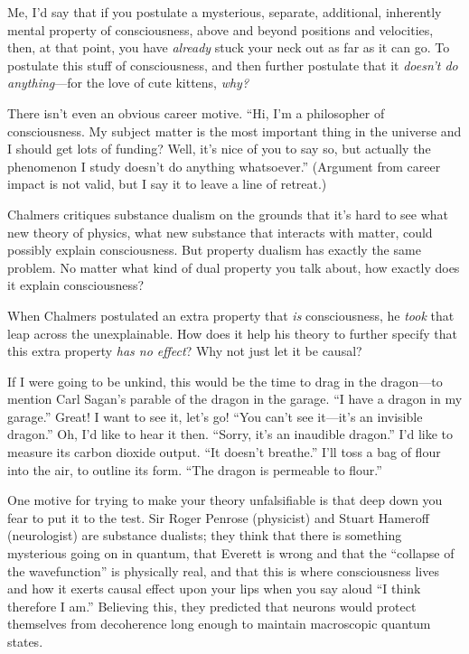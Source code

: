 {
 Me, I'd say that if you postulate a mysterious,
separate, additional, inherently mental property of consciousness,
above and beyond positions and velocities, then, at that point, you
have \textit{already} stuck your neck out as far as it can go. To
postulate this stuff of consciousness, and then further postulate that
it \textit{doesn't do anything}{}---for the love of
cute kittens, \textit{why?}}

{
 There isn't even an obvious career motive.
``Hi, I'm a philosopher of
consciousness. My subject matter is the most important thing in the
universe and I should get lots of funding? Well, it's
nice of you to say so, but actually the phenomenon I study
doesn't do anything whatsoever.''
(Argument from career impact is not valid, but I say it to leave a line
of retreat.)}

{
 Chalmers critiques substance dualism on the grounds that
it's hard to see what new theory of physics, what new
substance that interacts with matter, could possibly explain
consciousness. But property dualism has exactly the same problem. No
matter what kind of dual property you talk about, how exactly does it
explain consciousness?}

{
 When Chalmers postulated an extra property that \textit{is}
consciousness, he \textit{took} that leap across the unexplainable. How
does it help his theory to further specify that this extra property
\textit{has no effect}? Why not just let it be causal?}

{
 If I were going to be unkind, this would be the time to drag in
the dragon---to mention Carl Sagan's parable of the
dragon in the garage. ``I have a dragon in my
garage.'' Great! I want to see it,
let's go! ``You can't
see it---it's an invisible dragon.''
Oh, I'd like to hear it then. ``Sorry,
it's an inaudible dragon.''
I'd like to measure its carbon dioxide output.
``It doesn't
breathe.'' I'll toss a bag of flour
into the air, to outline its form. ``The dragon is
permeable to flour.''}

{
 One motive for trying to make your theory unfalsifiable is that
deep down you fear to put it to the test. Sir Roger Penrose (physicist)
and Stuart Hameroff (neurologist) are substance dualists; they think
that there is something mysterious going on in quantum, that Everett is
wrong and that the ``collapse of the
wavefunction'' is physically real, and that this is
where consciousness lives and how it exerts causal effect upon your
lips when you say aloud ``I think therefore I
am.'' Believing this, they predicted that neurons
would protect themselves from decoherence long enough to maintain
macroscopic quantum states.}

